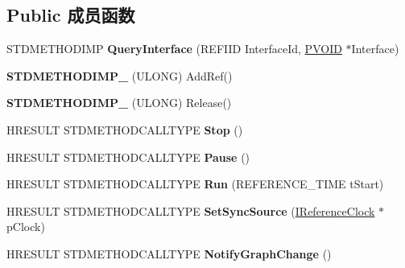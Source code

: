 \subsection*{Public 成员函数}
\begin{DoxyCompactItemize}
\item 
\mbox{\label{class_c_v_p_v_b_i_config_a50353ef2c22bfaf2de24bbe46a9c6006}} 
S\+T\+D\+M\+E\+T\+H\+O\+D\+I\+MP {\bfseries Query\+Interface} (R\+E\+F\+I\+ID Interface\+Id, \hyperlink{interfacevoid}{P\+V\+O\+ID} $\ast$Interface)
\item 
\mbox{\label{class_c_v_p_v_b_i_config_a81ddbfeb13ece388178b3b52163fd0ec}} 
{\bfseries S\+T\+D\+M\+E\+T\+H\+O\+D\+I\+M\+P\+\_\+} (U\+L\+O\+NG) Add\+Ref()
\item 
\mbox{\label{class_c_v_p_v_b_i_config_a4ad0dae922845775706c5758e151e51b}} 
{\bfseries S\+T\+D\+M\+E\+T\+H\+O\+D\+I\+M\+P\+\_\+} (U\+L\+O\+NG) Release()
\item 
\mbox{\label{class_c_v_p_v_b_i_config_a0bf45e909f7f8fee5dc0c607f1426a74}} 
H\+R\+E\+S\+U\+LT S\+T\+D\+M\+E\+T\+H\+O\+D\+C\+A\+L\+L\+T\+Y\+PE {\bfseries Stop} ()
\item 
\mbox{\label{class_c_v_p_v_b_i_config_a2dfd62615f1f9d965171d9b4a0b15230}} 
H\+R\+E\+S\+U\+LT S\+T\+D\+M\+E\+T\+H\+O\+D\+C\+A\+L\+L\+T\+Y\+PE {\bfseries Pause} ()
\item 
\mbox{\label{class_c_v_p_v_b_i_config_a266fa5f8ccc03582fe34ebac720c636a}} 
H\+R\+E\+S\+U\+LT S\+T\+D\+M\+E\+T\+H\+O\+D\+C\+A\+L\+L\+T\+Y\+PE {\bfseries Run} (R\+E\+F\+E\+R\+E\+N\+C\+E\+\_\+\+T\+I\+ME t\+Start)
\item 
\mbox{\label{class_c_v_p_v_b_i_config_ac1ea41f067d16c144574bbd85daf6523}} 
H\+R\+E\+S\+U\+LT S\+T\+D\+M\+E\+T\+H\+O\+D\+C\+A\+L\+L\+T\+Y\+PE {\bfseries Set\+Sync\+Source} (\hyperlink{interface_i_reference_clock}{I\+Reference\+Clock} $\ast$p\+Clock)
\item 
\mbox{\label{class_c_v_p_v_b_i_config_af8e74c8027fe9d9edb298df6ebedb5d9}} 
H\+R\+E\+S\+U\+LT S\+T\+D\+M\+E\+T\+H\+O\+D\+C\+A\+L\+L\+T\+Y\+PE {\bfseries Notify\+Graph\+Change} ()

\end{DoxyCompactItemize}
